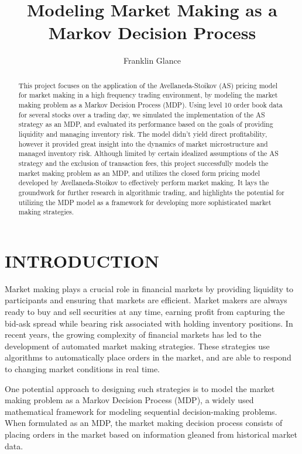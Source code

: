 \documentclass[letterpaper, 10 pt, conference]{ieeeconf}  %
\title{\LARGE \bf
Modeling Market Making as a Markov Decision Process
}
\author{Franklin Glance}
\begin{document}
\maketitle
\thispagestyle{empty}
\pagestyle{empty}


\begin{abstract}

This project focuses on the application of the Avellaneda-Stoikov (AS) pricing model for market making in a high frequency trading environment, by modeling the market making problem as a Markov Decision Process (MDP). Using level 10 order book data for several stocks over a trading day, we simulated the implementation of the AS strategy as an MDP, and evaluated its performance based on the goals of providing liquidity and managing inventory risk. The model didn't yield direct profitability, however it provided great insight into the dynamics of market microstructure and managed inventory risk. Although limited by certain idealized assumptions of the AS strategy and the exclusion of transaction fees, this project successfully models the market making problem as an MDP, and utilizes the closed form pricing model developed by Avellaneda-Stoikov to effectively perform market making. It lays the groundwork for further research in algorithmic trading, and highlights the potential for utilizing the MDP model as a framework for developing more sophisticated market making strategies.   

\end{abstract}


\section{INTRODUCTION}
Market making plays a crucial role in financial markets by providing liquidity to participants and ensuring that markets are efficient. Market makers are always ready to buy and sell securities at any time, earning profit from capturing the bid-ask spread while bearing risk associated with holding inventory positions. In recent years, the growing complexity of financial markets has led to the development of automated market making strategies. These strategies use algorithms to automatically place orders in the market, and are able to respond to changing market conditions in real time. 

One potential approach to designing such strategies is to model the market making problem as a Markov Decision Process (MDP), a widely used mathematical framework for modeling sequential decision-making problems. When formulated as an MDP, the market making decision process consists of placing orders in the market based on information gleaned from historical market data.
\end{document}
